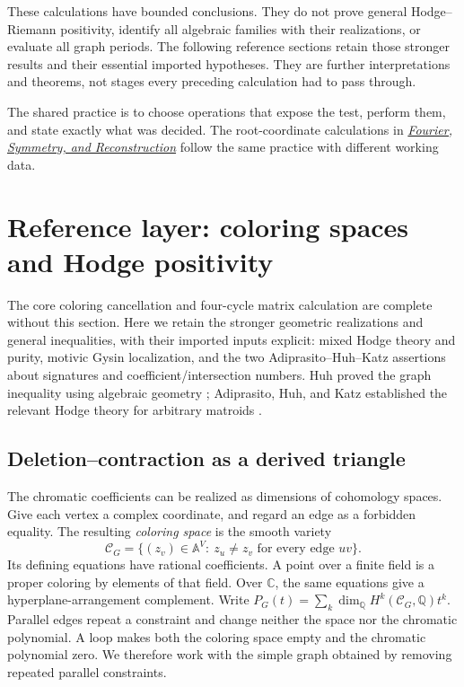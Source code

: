 \documentclass[11pt]{article}
\theoremstyle{definition}
\theoremstyle{remark}
\newcommand{\Q}{\mathbb Q}
\newcommand{\C}{\mathbb C}
\newcommand{\A}{\mathbb A}
\begin{document}
These calculations have bounded conclusions. They do not prove general Hodge--Riemann positivity, identify all algebraic families with their realizations, or evaluate all graph periods. The following reference sections retain those stronger results and their essential imported hypotheses. They are further interpretations and theorems, not stages every preceding calculation had to pass through.

The shared practice is to choose operations that expose the test, perform them, and state exactly what was decided. The root-coordinate calculations in \href{https://refactor.press/notes/fourier-symmetry-and-reconstruction}{\emph{Fourier, Symmetry, and Reconstruction}} follow the same practice with different working data.

\section{Reference layer: coloring spaces and Hodge positivity}
\label{sec:background-coloring}

The core coloring cancellation and four-cycle matrix calculation are complete without this section. Here we retain the stronger geometric realizations and general inequalities, with their imported inputs explicit: mixed Hodge theory and purity, motivic Gysin localization, and the two Adiprasito--Huh--Katz assertions about signatures and coefficient/intersection numbers. Huh proved the graph inequality using algebraic geometry \cite{gmhHuh2012}; Adiprasito, Huh, and Katz established the relevant Hodge theory for arbitrary matroids \cite{gmhAHK2018}.

\subsection{Deletion--contraction as a derived triangle}
\label{sec:dag-coloring-space}

The chromatic coefficients can be realized as dimensions of cohomology spaces.
Give each vertex a complex coordinate, and regard an edge as a forbidden
equality. The resulting \emph{coloring space} is the smooth variety
\[
 \mathcal C_G=\{(z_v)\in\A^V:\ z_u\ne z_v\text{ for every edge }uv\}.
\]
Its defining equations have rational coefficients. A point over a finite
field is a proper coloring by elements of that field. Over $\C$, the same
equations give a hyperplane-arrangement complement. Write
$P_G(t)=\sum_k\dim_\Q H^k(\mathcal C_G,\Q)t^k$.
Parallel edges repeat a constraint and change neither the space nor the
chromatic polynomial. A loop makes both the coloring space empty and
the chromatic polynomial zero. We therefore work with the simple graph
obtained by removing repeated parallel constraints.
\end{document}
